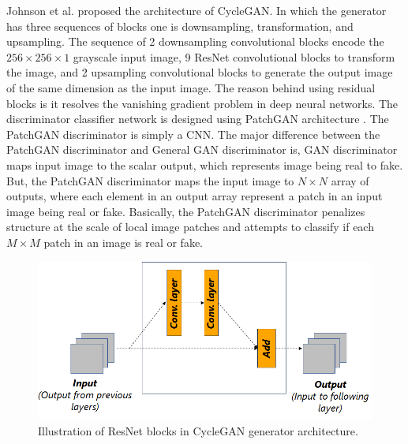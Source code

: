Johnson et al.\cite{johnson2016perceptual} proposed the architecture of \ac{CycleGAN}. In which the generator has three sequences of blocks one is downsampling, transformation, and upsampling. The sequence of 2 downsampling convolutional blocks encode the $256 \times 256 \times 1$ grayscale input image, 9 \ac{ResNet} convolutional blocks to transform the image, and 2 upsampling convolutional blocks to generate the output image of the same dimension as the input image. The reason behind using residual blocks is it resolves the vanishing gradient problem in deep neural networks. The discriminator classifier network is designed using PatchGAN architecture \cite{isola2018imagetoimage} \cite{li2016precomputed}. The PatchGAN discriminator is simply a \ac{CNN}. The major difference between the PatchGAN discriminator and General \ac{GAN} discriminator is, \ac{GAN} discriminator maps input image to the scalar output, which represents image being real to fake. But, the PatchGAN discriminator maps the input image to $N \times N$ array of outputs, where each element in an output array represent a patch in an input image being real or fake. Basically, the PatchGAN discriminator penalizes structure at the scale of local image patches and attempts to classify if each $M \times M$ patch in an image is real or fake.

\begin{figure}[H]
        \begin{center}
	    \includegraphics[scale=0.65]{images/Implementation/resnetBlocks.png}
	    \caption[Illustration of ResNet blocks in \ac{CycleGAN} generator architecture.]{Illustration of ResNet blocks in \ac{CycleGAN} generator architecture.}
	    \label{fig:resnetBlock}
	    \end{center}
\end{figure}

